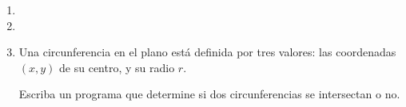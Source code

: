 \documentclass[11pt,spanish]{article}
\newcommand{\pond}[1]{[{\small\textbf{#1\%}}]}
\begin{document}
\begin{enumerate}[font=\Large\bfseries]
    \newpage
    \item
      \pond{25}

    \newpage
    \item
      \pond{25}

    \newpage
    \item
      \pond{25}
      Una circunferencia en el plano está definida por tres valores:
      las coordenadas \((x, y)\) de su centro, y su radio \(r\).

      Escriba un programa que determine si dos circunferencias
      se intersectan o no.

      \def\grilla{%
        \draw[gray] (0, 0) grid (14, 10);
        \draw[-latex'] (0, 0) to (15, 0);
        \draw[-latex'] (0, 0) to (0, 11);
      }
      \newcommand\circulo[3]{%
        \node[inner sep=1pt, fill, circle] (p1) at (#1, #2) {};
        \draw[very thick] (p1) circle (#3 cm);
      }

      \hfill
      \hfill

      \begin{minipage}[t]{.28\textwidth}
        
      \end{minipage}
      \hfill
      \begin{minipage}[t]{.28\textwidth}
        
      \end{minipage}
      \hfill
      \begin{minipage}[t]{.28\textwidth}
        
      \end{minipage}

  \end{enumerate}
\end{document}
